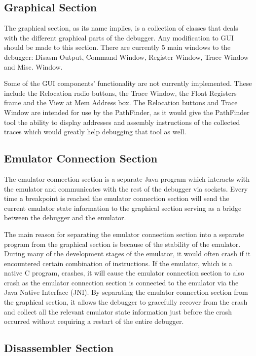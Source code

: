 \subsection{Graphical Section}

The graphical section, as its name implies, is a collection of classes that 
deals with the different graphical parts of the debugger. Any modification to 
GUI should be made to this section. There are currently 5 main windows to the 
debugger: Disasm Output, Command Window, Register Window, Trace Window and Misc.
Window. 

Some of the GUI components' functionality are not currently implemented. These 
include the Relocation radio buttons, the Trace Window, the Float Registers 
frame and the View at Mem Address box. The Relocation buttons and Trace Window 
are intended for use by the PathFinder, as it would give the PathFinder tool the
ability to display addresses and assembly instructions of the collected traces 
which would greatly help debugging that tool as well.


\subsection{Emulator Connection Section}

The emulator connection section is a separate Java program which interacts with 
the emulator and communicates with the rest of the debugger via sockets. Every 
time a breakpoint is reached the emulator connection section will send the 
current emulator state information to the graphical section serving as a bridge
between the debugger and the emulator. 

The main reason for separating the emulator connection section into a separate 
program from the graphical section is because of the stability of the emulator.
During many of the development stages of the emulator, it would often crash if 
it encountered certain combination of instructions. If the emulator, which is a 
native C program, crashes, it will cause the emulator connection section to also
crash as the emulator connection section is connected to the emulator via 
the Java Native Interface (JNI). 
By separating the emulator connection section from the graphical section, it 
allows the debugger to gracefully recover from the crash and collect all the 
relevant emulator state information just before the crash occurred without 
requiring a restart of the entire debugger. 


\subsection{Disassembler Section}

